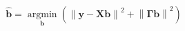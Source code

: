 \documentclass[10pt]{article}
\begin{document}
\[\boldsymbol{\hat{b}} = \operatorname*{argmin}_{\boldsymbol b} \left( \left\lVert \boldsymbol y - \boldsymbol X \boldsymbol b \right\rVert^2 + \left\lVert \boldsymbol \Gamma \boldsymbol b \right\rVert^2 \right)
\]
\end{document}
